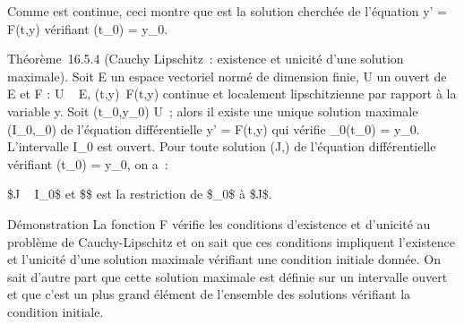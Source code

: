 Comme \phi est continue, ceci montre que \phi est la solution cherchée de
l'équation y' = F(t,y) vérifiant \phi(t_0) = y_0.

Théorème~16.5.4 (Cauchy Lipschitz~: existence et unicité d'une solution
maximale). Soit E un espace vectoriel normé de dimension finie, U un
ouvert de ~ \times E et F : U \rightarrow~ E, (t,y)\mapsto~F(t,y)
continue et localement lipschitzienne par rapport à la variable y. Soit
(t_0,y_0) \in U~; alors il existe une unique solution
maximale (I_0,\phi_0) de l'équation différentielle y' =
F(t,y) qui vérifie \phi_0(t_0) = y_0.
L'intervalle I_0 est ouvert. Pour toute solution (J,\psi) de
l'équation différentielle vérifiant \psi(t_0) = y_0, on
a~:

\text\$J \subset~ I_0\$ et \$\psi\$ est la restriction
de \$\phi_0\$ à \$J\$.

Démonstration La fonction F vérifie les conditions d'existence et
d'unicité au problème de Cauchy-Lipschitz et on sait que ces conditions
impliquent l'existence et l'unicité d'une solution maximale vérifiant
une condition initiale donnée. On sait d'autre part que cette solution
maximale est définie sur un intervalle ouvert et que c'est un plus grand
élément de l'ensemble des solutions vérifiant la condition initiale.


